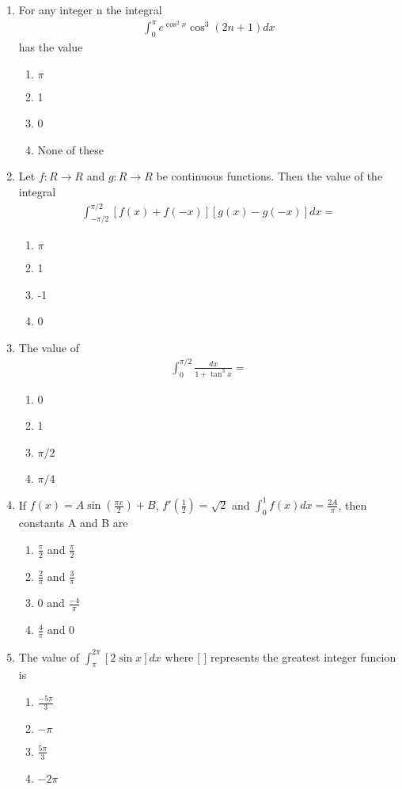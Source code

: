 \begin{enumerate}[label=\arabic*.,ref=\thesubsection.\theenumi]
\item For any integer n the integral
\begin{align*}
\int_{0}^{\pi}e^{\cos^{2}x}\cos^{3}(2n + 1)dx
\end{align*}
has the value
\begin{enumerate}
\item $\pi$
\item 1
\item 0
\item None of these
\end{enumerate}

\item Let $f: R \to R$ and $g: R \to R$ be continuous functions. Then the value of the integral
\begin{align*}
\int_{-\pi/2}^{\pi/2}[f(x) + f(-x)][g(x) - g(-x)]dx = 
\end{align*}
\begin{enumerate}
\item $\pi$
\item 1
\item -1
\item 0
\end{enumerate}

\item The value of 
\begin{align*}
\int_{0}^{\pi/2}\frac{dx}{1 + \tan^{3}x} = 
\end{align*}
\begin{enumerate}
\item 0
\item 1
\item $\pi/2$
\item $\pi/4$
\end{enumerate}

\item If $f(x) = A\sin(\frac{\pi x}{2}) + B$, $f'(\frac{1}{2}) = \sqrt{2}$ and $\int_{0}^{1}f(x)dx = \frac{2A}{\pi}$, then constants A and B are
\begin{enumerate}
\item $\frac{\pi}{2}$ and $\frac{\pi}{2}$
\item $\frac{2}{\pi}$ and $\frac{3}{\pi}$
\item 0 and $\frac{-4}{\pi}$
\item $\frac{4}{\pi}$ and 0
\end{enumerate}

\item The value of 
$\int_{\pi}^{2\pi}[2\sin x]dx$
where [ ] represents the greatest integer funcion is
\begin{enumerate}
\item $\frac{-5\pi}{3}$
\item $-\pi$
\item $\frac{5\pi}{3}$
\item $-2\pi$
\end{enumerate}


\end{enumerate}
